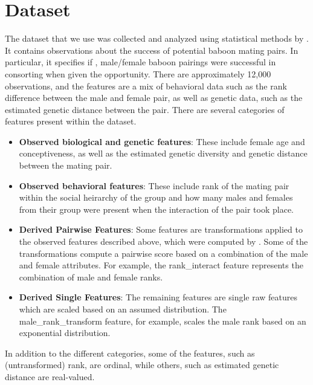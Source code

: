 \documentclass[twoside,twocolumn,paper=letter,fontsize=11pt]{article}
\begin{document}
\section{Dataset}
The dataset that we use was collected and analyzed using statistical methods by
\cite{Tung:2012}. It contains observations about the success of potential baboon
mating pairs. In particular, it specifies if , male/female baboon pairings were
successful in consorting when given the opportunity.  There are approximately
12,000 observations, and the features are a mix of behavioral data such as the
rank difference between the male and female pair, as well as genetic data, such
as the estimated genetic distance between the pair. 
There are several categories of features present within the dataset.
\begin{itemize}
  \item{\textbf{Observed biological and genetic features}: These include female age
    and conceptiveness, as well as the estimated genetic diversity and genetic
    distance between the mating pair.}
  \item{\textbf{Observed behavioral features}: These include rank of the mating pair
    within the social heirarchy of the group and how many males and females from
    their group were present when the interaction of the pair took place.}
  \item{\textbf{Derived Pairwise Features}: Some features are
    transformations applied to the observed features described above, which were
    computed by \cite{Tung:2012}. Some of the transformations compute a pairwise
    score based on a combination of the male and female attributes. For example,
    the rank\_interact feature represents the combination of male and female
    ranks.
    }
  \item{\textbf{Derived Single Features}: The remaining features are single
    raw features which are scaled based on an assumed distribution.  The
    male\_rank\_transform feature, for example, scales the male rank based on an
    exponential distribution.}
\end{itemize}

In addition to the different categories, some of the features, such as
(untransformed) rank, are ordinal, while others, such as estimated genetic
distance are real-valued.\\
\end{document}

